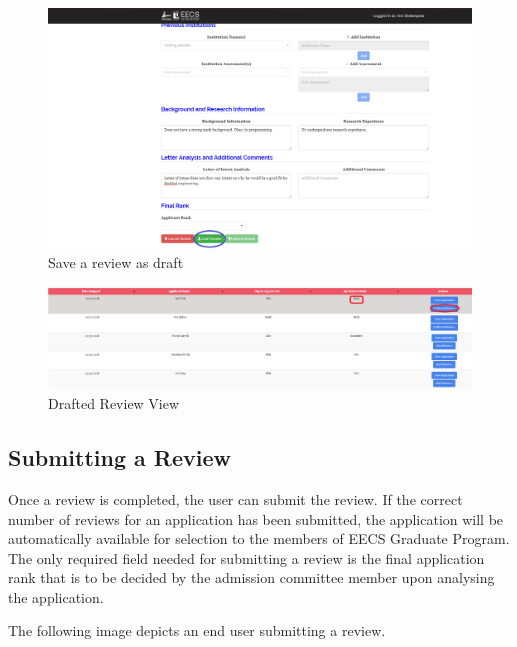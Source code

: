 \documentclass[fontsize=12pt,paper=letter,twoside]{scrartcl}
\begin{document}
\begin{figure}[!htb]
\begin{center}
\includegraphics[width=.9\textwidth]{images/save_as_draft_review.png}
\end{center}
\caption{Save a review as draft}
\label{fig:save_as_draft_review}
\end{figure}

\begin{figure}[!htb]
\begin{center}
\includegraphics[width=.9\textwidth]{images/drafted_review.png}
\end{center}
\caption{Drafted Review View}
\label{fig:drafted_review}
\end{figure}

\subsection{Submitting a Review}
Once a review is completed, the user can submit the review. If the correct number of reviews for an application has been submitted, the application will be automatically available for selection to the members of EECS Graduate Program. The only required field needed for submitting a review is the final application rank that is to be decided by the admission committee member upon analysing the application.

\bigskip
\noindent The following image depicts an end user submitting a review. 
\end{document}
